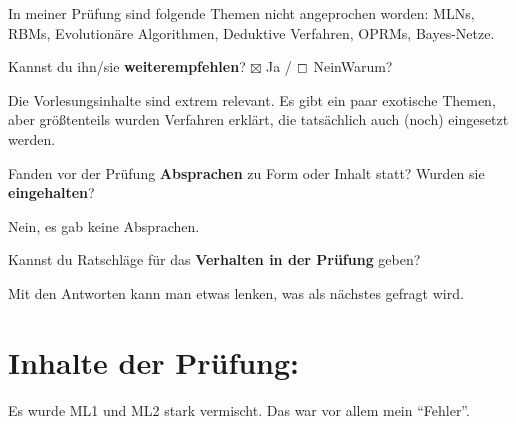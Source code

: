 \documentclass[a4paper]{article}
\begin{document}
\begin{multicols}{2}
\begin{minipage}[t][7cm]{\linewidth}
    In meiner Prüfung sind folgende Themen nicht angeprochen worden: MLNs,
    RBMs, Evolutionäre Algorithmen, Deduktive Verfahren, OPRMs, Bayes-Netze.
  \end{minipage}

\columnbreak

   Kannst du ihn/sie \textbf{weiterempfehlen}?
  $\boxtimes$ Ja / $\boxempty$ Nein\newline Warum? \\
  \begin{minipage}[t][6.8cm]{\linewidth}
    Die Vorlesungsinhalte sind extrem relevant. Es gibt ein paar exotische
    Themen, aber größtenteils wurden Verfahren erklärt, die tatsächlich auch
    (noch) eingesetzt werden.

  \end{minipage}

   Fanden vor der Prüfung \textbf{Absprachen} zu Form oder Inhalt statt? Wurden sie \textbf{eingehalten}? \\
  \begin{minipage}[t][7cm]{\linewidth}
    Nein, es gab keine Absprachen.

  \end{minipage}

   Kannst du Ratschläge für das \textbf{Verhalten in der Prüfung} geben? \\
  \begin{minipage}[t][6.8cm]{\linewidth}
    Mit den Antworten kann man etwas lenken, was als nächstes
    gefragt wird.

  \end{minipage}
%
\end{multicols}
\clearpage

\section*{Inhalte der Prüfung:}

Es wurde ML1 und ML2 stark vermischt. Das war vor allem mein \enquote{Fehler}.
\end{document}
